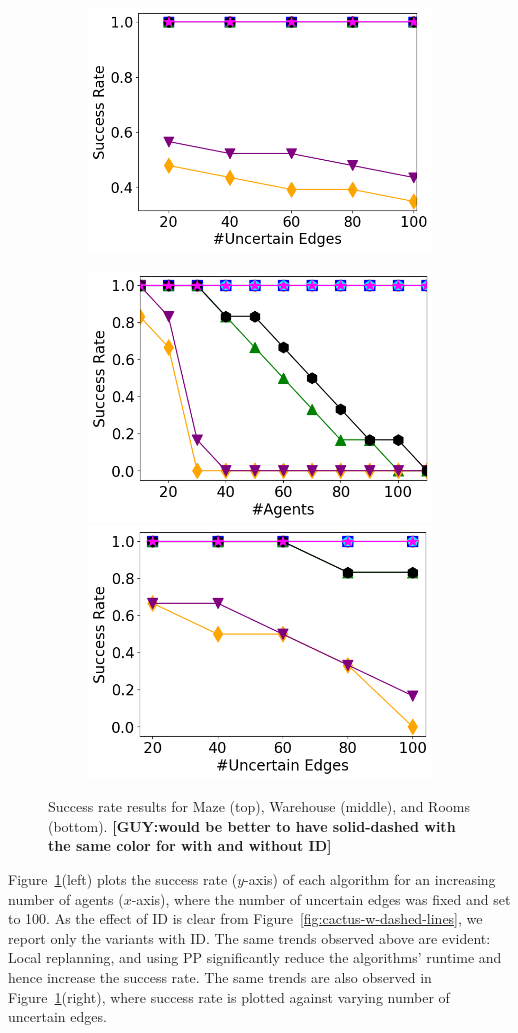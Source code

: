 \documentclass[letterpaper]{article} %
\def\
UrlFont{\rm}  %
\newcommand{\guy}[1]{\textbf{[\color{red}GUY:#1]}}
\theoremstyle{definition}
\begin{document}
{\begin{figure}[tbh]
\begin{subfigure}[b]{\columnwidth}
      \includegraphics[width=0.47\columnwidth]{Figures/warehouse/mixed_small_figures/Success-Rate(UEs)_k=40.png}
    \end{subfigure}
    \begin{subfigure}[b]{\columnwidth}\centering
      \includegraphics[width=0.47\columnwidth]{Figures/room/mixed_small_figures/Success-Rate(k)_pos=100.png}
      \includegraphics[width=0.47\columnwidth]{Figures/room/mixed_small_figures/Success-Rate(UEs)_k=30.png}
    \end{subfigure}
    \caption{Success rate results for Maze (top), Warehouse (middle), and Rooms (bottom). \guy{would be better to have solid-dashed with the same color for with and without ID}}
    \label{fig:success-rate}
\end{figure}
}

Figure~\ref{fig:success-rate}(left) plots the success rate ($y$-axis) of each algorithm for an increasing number of agents ($x$-axis), where the number of uncertain edges was fixed and set to 100. As the effect of ID is clear from Figure~\ref{fig:cactus-w-dashed-lines}, we report only the variants with ID.
The same trends observed above are evident: Local replanning, and using PP  significantly reduce the algorithms' runtime and hence increase the success rate.  The same trends are also observed in Figure~\ref{fig:success-rate}(right), where success rate is plotted against varying number of uncertain edges.
\end{document}
